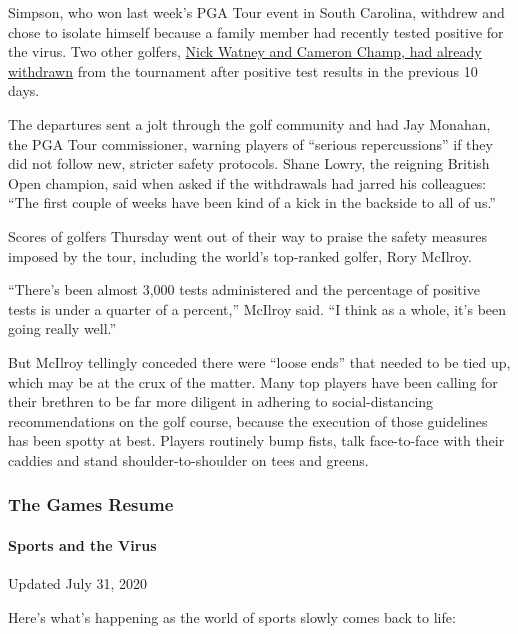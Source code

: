 Simpson, who won last week's PGA Tour event in South Carolina, withdrew
and chose to isolate himself because a family member had recently tested
positive for the virus. Two other golfers,
\href{https://www.nytimes.com/2020/06/20/sports/pga-tour-coronavirus-nick-watney.html}{Nick
Watney and Cameron Champ, had already withdrawn} from the tournament
after positive test results in the previous 10 days.

The departures sent a jolt through the golf community and had Jay
Monahan, the PGA Tour commissioner, warning players of ``serious
repercussions'' if they did not follow new, stricter safety protocols.
Shane Lowry, the reigning British Open champion, said when asked if the
withdrawals had jarred his colleagues: ``The first couple of weeks have
been kind of a kick in the backside to all of us.''

Scores of golfers Thursday went out of their way to praise the safety
measures imposed by the tour, including the world's top-ranked golfer,
Rory McIlroy.

``There's been almost 3,000 tests administered and the percentage of
positive tests is under a quarter of a percent,'' McIlroy said. ``I
think as a whole, it's been going really well.''

But McIlroy tellingly conceded there were ``loose ends'' that needed to
be tied up, which may be at the crux of the matter. Many top players
have been calling for their brethren to be far more diligent in adhering
to social-distancing recommendations on the golf course, because the
execution of those guidelines has been spotty at best. Players routinely
bump fists, talk face-to-face with their caddies and stand
shoulder-to-shoulder on tees and greens.

\hypertarget{the-games-resume}{%
\subsubsection{The Games Resume}\label{the-games-resume}}

\hypertarget{sports-and-the-virus}{%
\paragraph{Sports and the Virus}\label{sports-and-the-virus}}

Updated July 31, 2020

Here's what's happening as the world of sports slowly comes back to
life:

